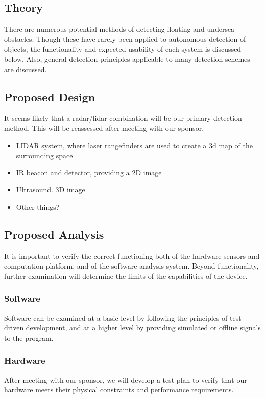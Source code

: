 \subsection{\label{sec:method:theory}Theory}
There are numerous potential methods of detecting floating and undersea obstacles. Though these have rarely been applied to autonomous detection of objects, the functionality and expected usability of each system is discussed below. Also, general detection principles applicable to many detection schemes are discussed.


\subsection{\label{sec:method:proposed-design}Proposed Design}
It seems likely that a radar/lidar combination will be our primary detection method.  This will be reassessed after meeting with our sponsor.


\begin{itemize}
\item LIDAR system, where laser rangefinders are used to create a 3d map of the surrounding space
\item IR beacon and detector, providing a 2D image
\item Ultrasound. 3D image
\item Other things?
\end{itemize}



\subsection{\label{sec:method:proposed-analysis}Proposed Analysis}
It is important to verify the correct functioning both of the hardware sensors and computation platform, and of the software analysis system. Beyond functionality, further examination will determine the limits of the capabilities of the device.
\subsubsection{\label{sec:method:proposed-analysis:software}Software}
Software can be examined at a basic level by following the principles of test driven development, and at a higher level by providing simulated or offline signals to the program.

\subsubsection{\label{sec:method:proposed-analysis:hardware}Hardware}
After meeting with our sponsor, we will develop a test plan to verify that our hardware meets their physical constraints and performance requirements.

